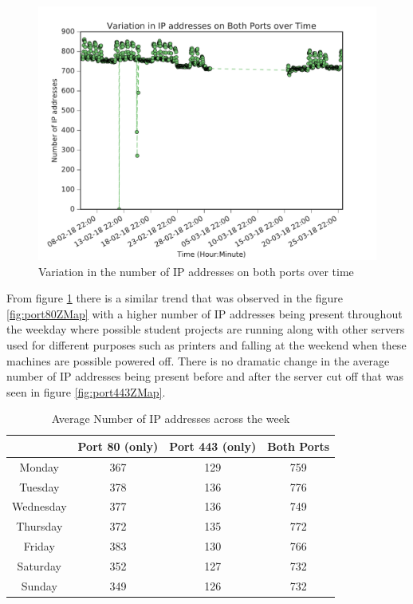 \documentclass[a4wide,leqno,12pt]{report}
\begin{document}
\begin{figure}[H]
\centering
\includegraphics[scale=.5]{pdf_images/VariationInIpAddressesOnBothPortsOverTime}
\caption{Variation in the number of IP addresses on both ports over time}
\label{fig:portsBothZMap}
\end{figure}
From figure \ref{fig:portsBothZMap} there is a similar trend that was observed in the figure \ref{fig:port80ZMap} with a higher number of IP addresses being present throughout the weekday where possible student projects are running along with other servers used for different purposes such as printers and falling at the weekend when these machines are possible powered off. There is no dramatic change in the average number of IP addresses being present before and after the server cut off that was seen in figure \ref{fig:port443ZMap}.

\begin{table}[H]
\centering
\begin{tabular}{||c c c c ||}
 \hline
  & Port 80 (only) & Port 443 (only) & Both Ports \\ [0.5ex]
 \hline\hline
 Monday & 367 & 129 & 759  \\
 Tuesday & 378 & 136 & 776 \\
 Wednesday & 377 & 136 & 749 \\
 Thursday & 372 & 135 & 772  \\
 Friday & 383 & 130 & 766 \\
 Saturday & 352 & 127 & 732\\
 Sunday & 349 & 126 & 732\\[1ex]
 \hline
\end{tabular}
\caption{Average Number of IP addresses across the week}
\label{table:1}
\end{table}
\end{document}
